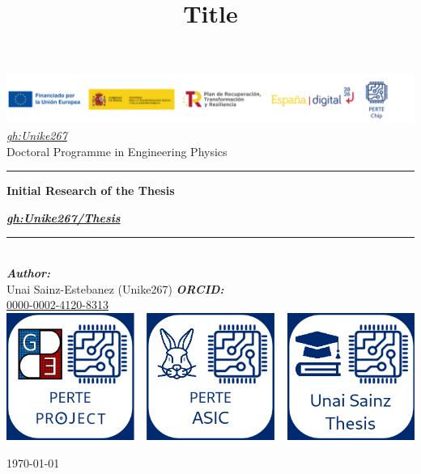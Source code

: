 
\newcommand{\gh}{\href{https://github.com/Unike267}{gh:Unike267}}
\newcommand{\type}{Doctoral Programme in Engineering Physics}
\newcommand{\titulo}{Initial Research of the Thesis} %
\title{Title}
\newcommand{\subtitle}{\textit{\href{https://github.com/Unike267/Thesis}{gh:Unike267/Thesis}}}

\begin{center}\leavevmode
    \normalfont
    \includegraphics[width=1.05 \columnwidth]{figures/logos_perte.png}
    \vskip 10mm 
    \textit{\Large \gh}\\[1 cm]
    {\large \type}
    \vskip 5mm
    \rule{\linewidth}{0.2 mm}
    {\huge \bfseries \titulo \par}
    \vskip 5mm
    {\Large \bfseries \subtitle \par}
    \rule{\linewidth}{0.2 mm}\\[1.5 cm]
    \large
	\emph{\textbf{Author:}}\\
    Unai Sainz-Estebanez (Unike267)
    \vskip 5mm
	\emph{\textbf{ORCID:}}\\
    \href{https://orcid.org/0000-0002-4120-8313}{0000-0002-4120-8313}
    \vskip 20mm 
    \includegraphics[width=0.75 \columnwidth]{figures/logo.png}
    \vfill
    {\normalsize \today \par}
\end{center}
\cleardoublepage
